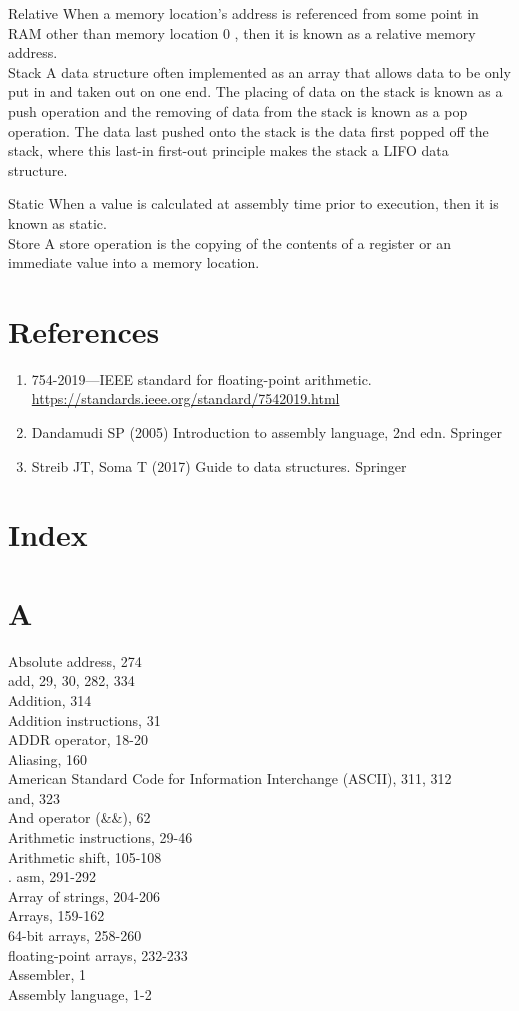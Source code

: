 \documentclass[10pt]{article}
\begin{document}
Relative When a memory location's address is referenced from some point in RAM other than memory location 0 , then it is known as a relative memory address.\\
Stack A data structure often implemented as an array that allows data to be only put in and taken out on one end. The placing of data on the stack is known as a push operation and the removing of data from the stack is known as a pop operation. The data last pushed onto the stack is the data first popped off the stack, where this last-in first-out principle makes the stack a LIFO data structure.

Static When a value is calculated at assembly time prior to execution, then it is known as static.\\
Store A store operation is the copying of the contents of a register or an immediate value into a memory location.

\section*{References}
\begin{enumerate}
  \item 754-2019—IEEE standard for floating-point arithmetic. \href{https://standards.ieee.org/standard/7542019.html}{https://standards.ieee.org/standard/7542019.html}
  \item Dandamudi SP (2005) Introduction to assembly language, 2nd edn. Springer
  \item Streib JT, Soma T (2017) Guide to data structures. Springer
\end{enumerate}

\section*{Index}
\section*{A}
Absolute address, 274\\
add, 29, 30, 282, 334\\
Addition, 314\\
Addition instructions, 31\\
ADDR operator, 18-20\\
Aliasing, 160\\
American Standard Code for Information Interchange (ASCII), 311, 312\\
and, 323\\
And operator (\&\&), 62\\
Arithmetic instructions, 29-46\\
Arithmetic shift, 105-108\\
. asm, 291-292\\
Array of strings, 204-206\\
Arrays, 159-162\\
64-bit arrays, 258-260\\
floating-point arrays, 232-233\\
Assembler, 1\\
Assembly language, 1-2
\end{document}
